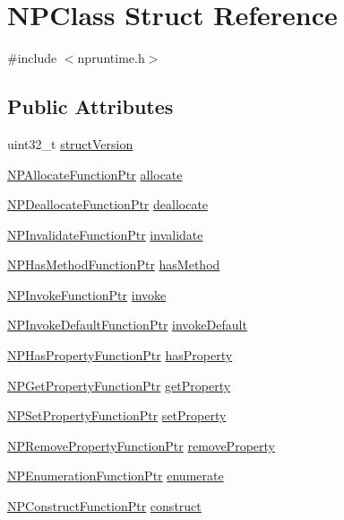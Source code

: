 \hypertarget{struct_n_p_class}{
\section{NPClass Struct Reference}
\label{struct_n_p_class}
}


{\ttfamily \#include $<$npruntime.h$>$}

\subsection*{Public Attributes}
\begin{DoxyCompactItemize}
\item 
uint32\_\-t \hyperlink{struct_n_p_class_a449b18ae2a318605881bd3a95506f4a3}{structVersion}
\item 
\hyperlink{npruntime_8h_aa76f2b5e9706333941ffa0ee06adfd0e}{NPAllocateFunctionPtr} \hyperlink{struct_n_p_class_aadb6db95a941e877d1bcdd16d4546464}{allocate}
\item 
\hyperlink{npruntime_8h_a7263e708e876b1c2b94dbe813efab59d}{NPDeallocateFunctionPtr} \hyperlink{struct_n_p_class_a9d6f7068e17c4788fc7057c4c96f0732}{deallocate}
\item 
\hyperlink{npruntime_8h_a1d6756e923caba4ce21e3c19a44aa60b}{NPInvalidateFunctionPtr} \hyperlink{struct_n_p_class_ac4475babe4b741353aef2b9edc876c17}{invalidate}
\item 
\hyperlink{npruntime_8h_af1dc491c0dc1ba94beb165b2da07033c}{NPHasMethodFunctionPtr} \hyperlink{struct_n_p_class_aa59d4bb55b6a5635a1adf5258209dd8b}{hasMethod}
\item 
\hyperlink{npruntime_8h_a7199507ea64f871670cdff6315f9fc7f}{NPInvokeFunctionPtr} \hyperlink{struct_n_p_class_a900be8995f5aa9aa871e311f49fb9fb9}{invoke}
\item 
\hyperlink{npruntime_8h_a0e8125d3ed1910aec5e4222dcc0d3268}{NPInvokeDefaultFunctionPtr} \hyperlink{struct_n_p_class_a8389ce604422deff95ad46f2332f288e}{invokeDefault}
\item 
\hyperlink{npruntime_8h_ae86161d253a04bade71320a4956f0ae1}{NPHasPropertyFunctionPtr} \hyperlink{struct_n_p_class_a8a0d2cfeacb08cfd00f166ca3a5ae12d}{hasProperty}
\item 
\hyperlink{npruntime_8h_a3524df19dbbd307619fa7eb74ab78b57}{NPGetPropertyFunctionPtr} \hyperlink{struct_n_p_class_a0f9451c93e48b9be7db5f49a1703ac09}{getProperty}
\item 
\hyperlink{npruntime_8h_a88d08dd620e00343807e27b1b4dbca3b}{NPSetPropertyFunctionPtr} \hyperlink{struct_n_p_class_ace75075a0c879d88182c73636d725533}{setProperty}
\item 
\hyperlink{npruntime_8h_a95bfc3871d7370fa312607a3f939eabb}{NPRemovePropertyFunctionPtr} \hyperlink{struct_n_p_class_abfd93f88c9a41e31be0f8419531ecf71}{removeProperty}
\item 
\hyperlink{npruntime_8h_aa6b7dbbc8077446e0543ee90bc5e8426}{NPEnumerationFunctionPtr} \hyperlink{struct_n_p_class_ad1e58581066ef685a5a82c7227a4b27a}{enumerate}
\item 
\hyperlink{npruntime_8h_a58f88c14c27e08060a358087e5d9fba9}{NPConstructFunctionPtr} \hyperlink{struct_n_p_class_a56806740859bd4e6e3e8262a43208cfd}{construct}
\end{DoxyCompactItemize}


